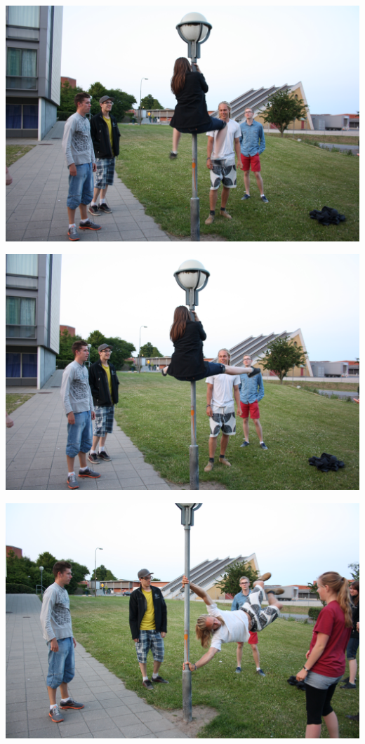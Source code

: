 \begin{minipage}[t]{120mm}
\vspace{3mm}
\includegraphics[width=\linewidth]{Alicia4.jpg}

\includegraphics[width=\linewidth]{Alicia5.jpg}

\includegraphics[width=\linewidth]{Tue1.jpg}

\end{minipage}

